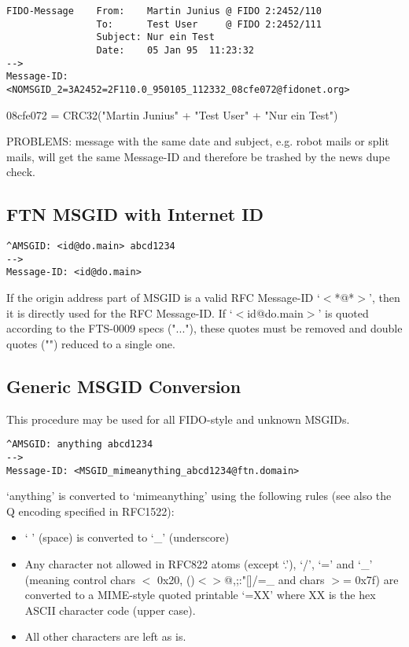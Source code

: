 \documentclass[letterpaper]{article}
\begin{document}
\begin{verbatim}
FIDO-Message    From:    Martin Junius @ FIDO 2:2452/110 
                To:      Test User     @ FIDO 2:2452/111 
                Subject: Nur ein Test 
                Date:    05 Jan 95  11:23:32 
--> 
Message-ID: <NOMSGID_2=3A2452=2F110.0_950105_112332_08cfe072@fidonet.org> 
\end{verbatim}


08cfe072 = CRC32("Martin Junius" + "Test User" + "Nur ein Test")

PROBLEMS: message with the same date and subject, e.g. robot mails or split mails, will get the same Message-ID and therefore be trashed by the news dupe check. 


\subsection{FTN MSGID with Internet ID }

\begin{verbatim}
^AMSGID: <id@do.main> abcd1234 
--> 
Message-ID: <id@do.main> 
\end{verbatim}


If the origin address part of MSGID is a valid RFC Message-ID `$<$*@*$>$', then it is directly used for the RFC Message-ID. If `$<$id@do.main$>$' is quoted according to the FTS-0009 specs ("..."), these quotes must be removed and double quotes ("") reduced to a single one. 


\subsection{Generic MSGID Conversion }



This procedure may be used for all FIDO-style and unknown MSGIDs.   
\begin{verbatim}
^AMSGID: anything abcd1234 
--> 
Message-ID: <MSGID_mimeanything_abcd1234@ftn.domain> 
\end{verbatim}


`anything' is converted to `mimeanything' using the following rules (see also the Q encoding specified in RFC1522): 
\begin{itemize}
\item ` ' (space) is converted to `\_' (underscore)  
\item Any character not allowed in RFC822 atoms (except `.'), `/', `=' and `\_' (meaning control chars $<$ 0x20, {\ttfamily ()$<$$>$@,;:"[]/=\_} and chars $>$= 0x7f) are converted to a MIME-style quoted printable `=XX' where XX is the hex ASCII character code (upper case).  
\item All other characters are left as is.   
\end{itemize}
\end{document}
